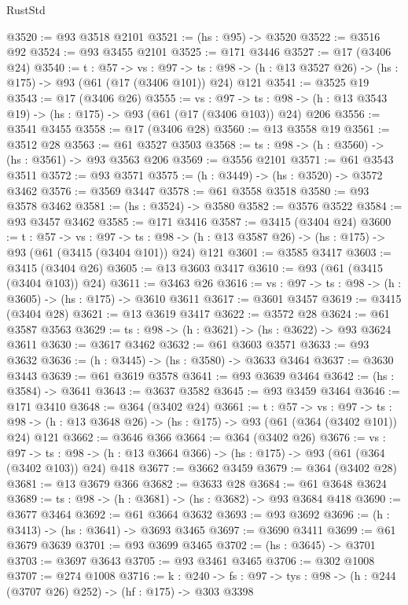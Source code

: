 \begin{lexlean}{RustStd}
\begin{coremodule}
{\begin{coremodule}
{{{{{{{{{@3520 := @93 @3518 @2101
@3521 := (hs : @95) -> @3520
@3522 := @3516 @92
@3524 := @93 @3455 @2101
@3525 := @171 @3446
@3527 := @17 (@3406 @24)
@3540 := {t : @57} ->
  {vs : @97} ->
  {ts : @98} -> (h : @13 @3527 @26) -> (hs : @175) -> @93 (@61 (@17 (@3406 @101)) @24) @121
@3541 := @3525 @19
@3543 := @17 (@3406 @26)
@3555 := {vs : @97} ->
  {ts : @98} -> (h : @13 @3543 @19) -> (hs : @175) -> @93 (@61 (@17 (@3406 @103)) @24) @206
@3556 := @3541 @3455
@3558 := @17 (@3406 @28)
@3560 := @13 @3558 @19
@3561 := @3512 @28
@3563 := @61 @3527 @3503
@3568 := {ts : @98} -> (h : @3560) -> (hs : @3561) -> @93 @3563 @206
@3569 := @3556 @2101
@3571 := @61 @3543 @3511
@3572 := @93 @3571
@3575 := (h : @3449) -> (hs : @3520) -> @3572 @3462
@3576 := @3569 @3447
@3578 := @61 @3558 @3518
@3580 := @93 @3578 @3462
@3581 := (hs : @3524) -> @3580
@3582 := @3576 @3522
@3584 := @93 @3457 @3462
@3585 := @171 @3416
@3587 := @3415 (@3404 @24)
@3600 := {t : @57} ->
  {vs : @97} ->
  {ts : @98} -> (h : @13 @3587 @26) -> (hs : @175) -> @93 (@61 (@3415 (@3404 @101)) @24) @121
@3601 := @3585 @3417
@3603 := @3415 (@3404 @26)
@3605 := @13 @3603 @3417
@3610 := @93 (@61 (@3415 (@3404 @103)) @24)
@3611 := @3463 @26
@3616 := {vs : @97} -> {ts : @98} -> (h : @3605) -> (hs : @175) -> @3610 @3611
@3617 := @3601 @3457
@3619 := @3415 (@3404 @28)
@3621 := @13 @3619 @3417
@3622 := @3572 @28
@3624 := @61 @3587 @3563
@3629 := {ts : @98} -> (h : @3621) -> (hs : @3622) -> @93 @3624 @3611
@3630 := @3617 @3462
@3632 := @61 @3603 @3571
@3633 := @93 @3632
@3636 := (h : @3445) -> (hs : @3580) -> @3633 @3464
@3637 := @3630 @3443
@3639 := @61 @3619 @3578
@3641 := @93 @3639 @3464
@3642 := (hs : @3584) -> @3641
@3643 := @3637 @3582
@3645 := @93 @3459 @3464
@3646 := @171 @3410
@3648 := @364 (@3402 @24)
@3661 := {t : @57} ->
  {vs : @97} ->
  {ts : @98} -> (h : @13 @3648 @26) -> (hs : @175) -> @93 (@61 (@364 (@3402 @101)) @24) @121
@3662 := @3646 @366
@3664 := @364 (@3402 @26)
@3676 := {vs : @97} ->
  {ts : @98} -> (h : @13 @3664 @366) -> (hs : @175) -> @93 (@61 (@364 (@3402 @103)) @24) @418
@3677 := @3662 @3459
@3679 := @364 (@3402 @28)
@3681 := @13 @3679 @366
@3682 := @3633 @28
@3684 := @61 @3648 @3624
@3689 := {ts : @98} -> (h : @3681) -> (hs : @3682) -> @93 @3684 @418
@3690 := @3677 @3464
@3692 := @61 @3664 @3632
@3693 := @93 @3692
@3696 := (h : @3413) -> (hs : @3641) -> @3693 @3465
@3697 := @3690 @3411
@3699 := @61 @3679 @3639
@3701 := @93 @3699 @3465
@3702 := (hs : @3645) -> @3701
@3703 := @3697 @3643
@3705 := @93 @3461 @3465
@3706 := @302 @1008
@3707 := @274 @1008
@3716 := {k : @240} ->
  {fs : @97} -> {tys : @98} -> (h : @244 (@3707 @26) @252) -> (hf : @175) -> @303 @3398
}}}}}}}}}
\end{coremodule}}
\end{coremodule}
\end{lexlean}
